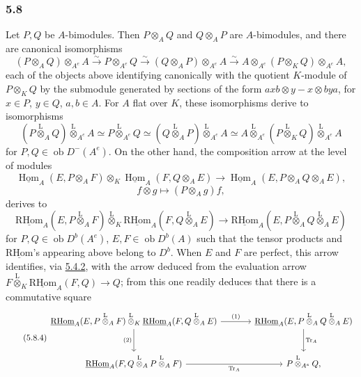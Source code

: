 \documentclass[11pt]{article}
\providecommand{\uHom}{\underline{\Hom}}
\providecommand{\uRHom}{\underline{\RHom}}
\DeclareMathOperator{\Hom}{Hom}
\newcommand{\ob}{\operatorname{ob}}
\providecommand{\RHom}{\mathrm{RHom}}
\providecommand{\Tr}{\operatorname{Tr}}
\providecommand{\Tr}{\operatorname{Tr}}
\providecommand{\lten}{\overset{\mathrm L}{\otimes}}
\providecommand{\Tr}{\operatorname{Tr}}
\providecommand{\RHom}{\mathrm{RHom}}
\providecommand{\Hom}{\operatorname{Hom}}
\providecommand{\ob}{\operatorname{ob}}
\providecommand{\lten}{\overset{\mathrm L}{\otimes}}
\providecommand{\RHom}{\mathrm R\mathcal{H}om}
\providecommand{\lten}{\overset{\mathrm L}{\otimes}}
\providecommand{\Tr}{\operatorname{Tr}}
\providecommand{\lten}{\overset{\mathrm L}{\otimes}}
\providecommand{\lten}{\overset{\mathrm L}{\otimes}}
\providecommand{\lten}{\overset{\mathrm L}{\otimes}}
\providecommand{\RHom}{\mathrm{RHom}}
\providecommand{\Hom}{\operatorname{Hom}}
\providecommand{\Tr}{\operatorname{Tr}}
\providecommand{\lten}{\overset{\mathrm L}{\otimes}}
\begin{document}
\subsubsection*{5.8}\label{sga5:IIIB:subsubsection:5.8}

Let $P,Q$ be $A$-bimodules. Then $P\otimes_AQ$ and $Q\otimes_AP$ are $A$-bimodules, and there are canonical isomorphisms
\begin{equation}\tag{5.8.1}\label{sga5:IIIB:equation:5.8.1}
(P\otimes_AQ)\otimes_{A^e}A\xrightarrow{\sim}P\otimes_{A^e}Q\xrightarrow{\sim}(Q\otimes_AP)\otimes_{A^e}A\xrightarrow{\sim}A\otimes_{A^e}(P\otimes_KQ)\otimes_{A^e}A,
\end{equation}
each of the objects above identifying canonically with the quotient $K$-module of $P\otimes_KQ$ by the submodule generated by sections of the form $axb\otimes y-x\otimes bya$, for $x\in P$, $y\in Q$, $a,b\in A$. For $A$ flat over $K$, these isomorphisms derive to isomorphisms
\begin{equation}\tag{5.8.2}\label{sga5:IIIB:equation:5.8.2}
(P\lten_AQ)\lten_{A^e}A\simeq P\lten_{A^e}Q\simeq(Q\lten_AP)\lten_{A^e}A\simeq A\lten_{A^e}(P\lten_KQ)\lten_{A^e}A
\end{equation}
for $P,Q\in\ob D^-(A^e)$. On the other hand, the composition arrow at the level of modules
\[
\uHom_A(E,P\otimes_AF)\otimes_K\uHom_A(F,Q\otimes_AE)
\longrightarrow\uHom_A(E,P\otimes_AQ\otimes_AE),
\]
\[
f\otimes g\longmapsto (P\otimes_Ag)f,
\]
derives to
\begin{equation}\tag{5.8.3}\label{sga5:IIIB:equation:5.8.3}
\uRHom_A(E,P\lten_AF)\lten_K\uRHom_A(F,Q\lten_AE)
\longrightarrow\uRHom_A(E,P\lten_AQ\lten_AE)
\end{equation}
for $P,Q\in\ob D^b(A^e)$, $E,F\in\ob D^b(A)$ such that the tensor products and $\uRHom$'s appearing above belong to $D^b$. When $E$ and $F$ are perfect, this arrow identifies, via \hyperref[sga5:IIIB:equation:5.4.2]{5.4.2}, with the arrow deduced from the evaluation arrow $F\lten_K\uRHom_A(F,Q)\to Q$; from this one readily deduces that there is a commutative square
\begin{equation}\tag{5.8.4}\label{sga5:IIIB:equation:5.8.4}
\begin{tikzcd}[column sep=large,row sep=large]
\uRHom_A(E,P\lten_AF)\lten_K\uRHom_A(F,Q\lten_AE) \arrow[r,"(1)"] \arrow[d,"(2)"'] & \uRHom_A(E,P\lten_AQ\lten_AE) \arrow[d,"\Tr_A"]\\
\uRHom_A(F,Q\lten_AP\lten_AF) \arrow[r,"\Tr_A"'] & P\lten_{A^e}Q,
\end{tikzcd}
\end{equation}
\end{document}

